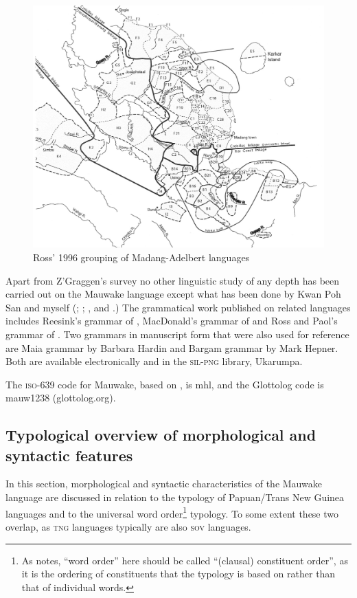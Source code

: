 \begin{figure}
\caption{Ross' 1996 grouping of Madang-Adelbert languages \citep[Map~4]{Ross1996}}
\label{map:4:MadangRoss}
\includegraphics[width=\textwidth]{figures/1-ross_grouping_of_Madang_Adelbert_languages_map.jpeg}
\end{figure}

Apart from Z'Graggen's survey no other linguistic study of any depth has been carried out on the Mauwake language except what has been done by Kwan Poh San and myself (\citealt{Kwan1980, Kwan1983, Kwan1988, Kwan1989, Kwan2002}; \citealt{Jarvinen1980,Jarvinen1988a,Jarvinen1988b,Jarvinen1989,Jarvinen1990,Jarvinen1991}; \citealt{JarvinenEtAl2001}, and \citealt{Berghall2006}.)  The grammatical work published on related languages includes Reesink's grammar of \citet{Usan1987}, MacDonald's grammar of \citet{Tauya1990} and Ross and Paol's grammar of \citet{Waskia1978}. Two grammars in manuscript form that were also used for reference are Maia grammar by Barbara Hardin and Bargam grammar by Mark Hepner. Both are available electronically and in the \textsc{sil-png} library, Ukarumpa.

The \textsc{iso}-639 code for Mauwake, based on \citet{Grimes2000}, is mhl, and the Glottolog code is mauw1238 (glottolog.org).

\subsection{Typological overview of morphological and syntactic features}
In this section, morphological and syntactic characteristics of the Mauwake language are discussed in relation to the typology of Papuan/Trans New Guinea languages and to the universal word order\footnote{As \citet[72]{Dixon2009} notes, ``word order'' here should be called ``(clausal) constituent order'', as it is the ordering of constituents that the typology is based on rather than that of individual words.}  typology.  To some extent these two overlap, as \textsc{tng} languages typically are also \textsc{sov} languages.

